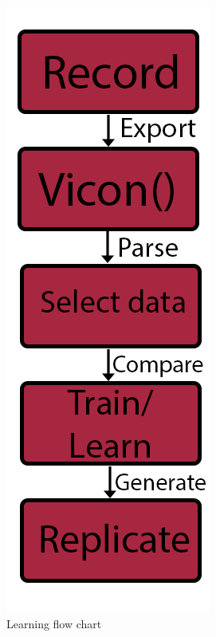 \begin{figure}
    \begin{subfigure}{0.4\linewidth} 
        \centering
        \captionsetup{justification=centering}
        \centerline{
        \includegraphics[scale=0.25]{images/software/flowchart.png}}
        \caption{Learning flow chart}
        \label{fig:flowchart}
    \end{subfigure}
    \begin{subfigure}{0.4\linewidth} 
        \centering
        \captionsetup{justification=centering}
        \centerline{
}
\end{subfigure}
\end{figure}
